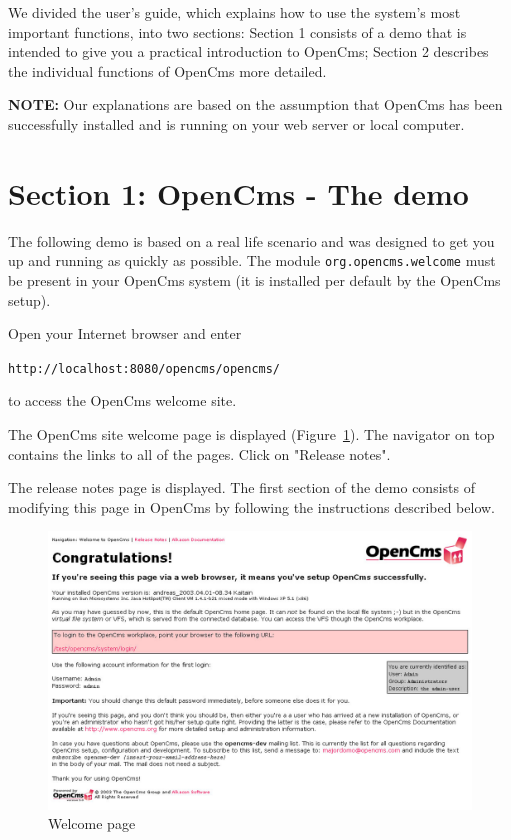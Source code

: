 We divided the user's guide, which explains how to use the system's
most important functions, into two sections: Section 1 consists of a
demo that is intended to give you a practical introduction to
OpenCms; Section 2 describes the individual functions of OpenCms 
more detailed.

\textbf{NOTE:} Our explanations are based on the assumption that
OpenCms has been successfully installed and is running on your web
server or local computer.

\newpage
\section{Section 1: OpenCms - The demo}

The following demo is based on a real life scenario and was
designed to get you up and running as quickly as possible.
The module \texttt{org.opencms.welcome} must be present in your OpenCms system
(it is installed per default by the OpenCms setup).

Open your Internet browser and enter

{\tt http://localhost:8080/opencms/opencms/}

to access the OpenCms welcome site.

The OpenCms site welcome page is displayed (Figure~\ref{demopage01}). The navigator on top contains
the links to all of the pages. Click on "Release notes".

The release notes page is displayed. The first
section of the demo consists of modifying this page in OpenCms by
following the instructions described below.

\begin{figure}[!hbt]
\begin{center}
\includegraphics[width=\sgw]
                   {pics/usermanual/demoPage01}
\caption[Welcome page]
           {Welcome page}
\label{demopage01}
\end{center}
\end{figure}

